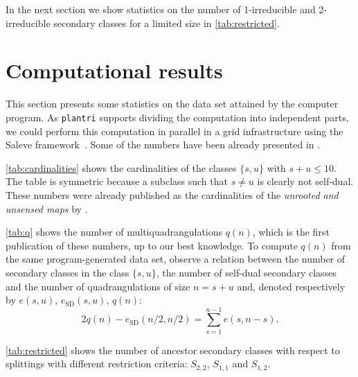 \documentclass[]{article}
\newcommand{\plantri}{{\tt plantri}\xspace}
\newcommand{\maps}{|\mathcal{I}^+|}\newcommand{\quads}{|\mathscr{Q}|}\newcommand{\sdquads}{|\mathscr{Q}_\text{SD}|}\renewcommand{\maps}{e}\renewcommand{\quads}{q}\renewcommand{\sdquads}{e_\text{SD}}
\begin{document}
In the next section we show statistics on the number of 1-irreducible and 2-irreducible secondary classes for a limited size in \autoref{tab:restricted}.


\section{Computational results}
\label{sec:stats}

This section presents some statistics on the data set attained by the computer program.
As \plantri supports dividing the computation into independent parts, we could perform this computation in parallel in a grid infrastructure using the Saleve framework~\cite{Dobe2010}.
Some of the numbers have been already presented in \cite{Kapolnai2011}.

\autoref{tab:cardinalities} shows the cardinalities of the classes $\{s,u\}$ with $s+u\leq 10$.
The table is symmetric because a subclass such that $s\neq u$ is clearly not self-dual.
These numbers were already published as the cardinalities of the \emph{unrooted and unsensed maps} by \citet{Wormald1981, Walsh1983, Walsh2012}.

\autoref{tab:q} shows the number of multiquadrangulations $\quads(n)$, which is the first publication of these numbers, up to our best knowledge.
To compute $\quads(n)$ from the same program-generated data set, 
observe a relation between the number of secondary classes in the class $\{s,u\}$, the number of self-dual secondary classes and the number of quadrangulations of size $n=s+u$ and, denoted respectively by $\maps(s,u)$, $\sdquads(s,u)$, $\quads(n)$:
\begin{equation}
\label{eq:card}
2\quads(n)-\sdquads\left(n/2,n/2\right)=\sum_{s=1}^{n-1}\maps(s,n-s).
\end{equation}


\autoref{tab:restricted} shows the number of ancestor secondary classes with respect to splittings with different restriction criteria: $S_{2,2}$, $S_{1,1}$ and $S_{1,2}$.
\end{document}
